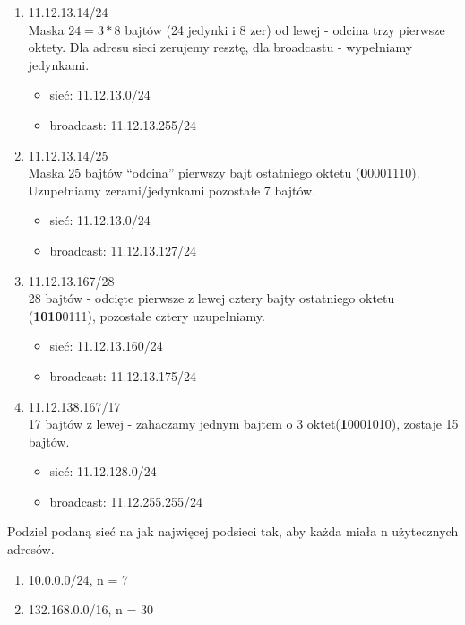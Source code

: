 \documentclass[12pt]{article}
\begin{document}
    \begin{enumerate}
        \item 11.12.13.14/24\\
        Maska $24 = 3*8$ bajtów (24 jedynki i 8 zer) od lewej - odcina trzy pierwsze oktety. Dla adresu sieci zerujemy
        resztę, dla broadcastu - wypełniamy jedynkami.
        \begin{itemize}
            \item sieć: 11.12.13.0/24
            \item broadcast: 11.12.13.255/24
        \end{itemize}
        \item 11.12.13.14/25\\
        Maska 25 bajtów ``odcina'' pierwszy bajt ostatniego oktetu (\textbf{0}0001110).
        Uzupełniamy zerami/jedynkami pozostałe 7 bajtów.
        \begin{itemize}
            \item sieć: 11.12.13.0/24
            \item broadcast: 11.12.13.127/24
        \end{itemize}
        \item 11.12.13.167/28\\
        28 bajtów - odcięte pierwsze z lewej cztery bajty ostatniego oktetu (\textbf{1010}0111), pozostałe cztery uzupełniamy.
        \begin{itemize}
            \item sieć: 11.12.13.160/24
            \item broadcast: 11.12.13.175/24
        \end{itemize}
        \item 11.12.138.167/17\\
        17 bajtów z lewej - zahaczamy jednym bajtem o 3 oktet(\textbf{1}0001010), zostaje 15 bajtów.
        \begin{itemize}
            \item sieć: 11.12.128.0/24
            \item broadcast: 11.12.255.255/24
        \end{itemize}
    \end{enumerate}

    \begin{exercise}
        Podziel podaną sieć na jak najwięcej podsieci tak, aby każda miała n użytecznych adresów.
        \begin{enumerate}
            \item 10.0.0.0/24, n = 7
            \item 132.168.0.0/16, n = 30
        \end{enumerate}
    \end{exercise}
\end{document}
